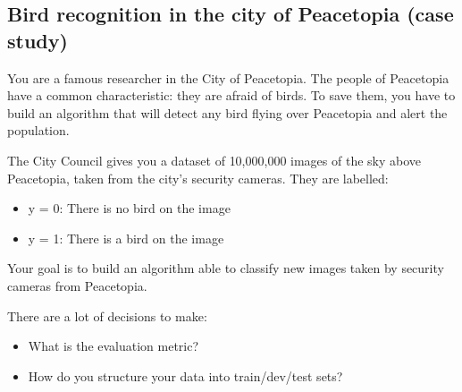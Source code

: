 \documentclass[12pt]{article}
\numberwithin{equation}{section}
\begin{document}
\subsection{Bird recognition in the city of Peacetopia (case study)}
You are a famous researcher in the City of Peacetopia. The people of Peacetopia have a common characteristic: they are afraid of birds. To save them, you have to build an algorithm that will detect any bird flying over Peacetopia and alert the population. \par
The City Council gives you a dataset of 10,000,000 images of the sky above Peacetopia, taken from the city's security cameras. They are labelled:
\begin{itemize}
	\item y = 0: There is no bird on the image
	\item y = 1: There is a bird on the image
\end{itemize}
Your goal is to build an algorithm able to classify new images taken by security cameras from Peacetopia.\par
There are a lot of decisions to make:
\begin{itemize}
	\item What is the evaluation metric?
	\item How do you structure your data into train/dev/test sets?
\end{itemize}
\end{document}
